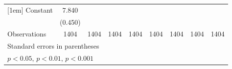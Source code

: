 \begin{table}[htbp]
\begin{tabular}{l*{8}{c}}
[1em]
Constant        &    7.840\sym{***}&                  &                  &                  &                  &                  &                  &                  \\
                &  (0.450)         &                  &                  &                  &                  &                  &                  &                  \\
\hline
Observations    &     1404         &     1404         &     1404         &     1404         &     1404         &     1404         &     1404         &     1404         \\
\hline\hline
\multicolumn{9}{l}{\footnotesize Standard errors in parentheses}\\
\multicolumn{9}{l}{\footnotesize \sym{*} \(p<0.05\), \sym{**} \(p<0.01\), \sym{***} \(p<0.001\)}\\
\end{tabular}
\end{table}
